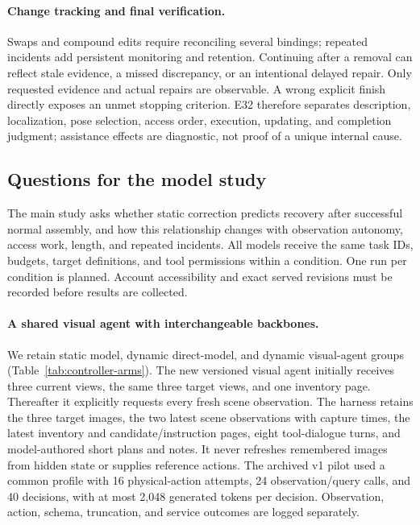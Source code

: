 \documentclass[10pt,twocolumn,letterpaper]{article}
\begin{document}
\paragraph{Change tracking and final verification.}
Swaps and compound edits require reconciling several bindings; repeated incidents add persistent monitoring and retention. Continuing after a removal can reflect stale evidence, a missed discrepancy, or an intentional delayed repair. Only requested evidence and actual repairs are observable. A wrong explicit finish directly exposes an unmet stopping criterion. E32 therefore separates description, localization, pose selection, access order, execution, updating, and completion judgment; assistance effects are diagnostic, not proof of a unique internal cause.



\subsection{Questions for the model study}
The main study asks whether static correction predicts recovery after successful normal assembly, and how this relationship changes with observation autonomy, access work, length, and repeated incidents. All models receive the same task IDs, budgets, target definitions, and tool permissions within a condition. One run per condition is planned. Account accessibility and exact served revisions must be recorded before results are collected.


\paragraph{A shared visual agent with interchangeable backbones.}
We retain static model, dynamic direct-model, and dynamic visual-agent groups (Table~\ref{tab:controller-arms}). The new versioned visual agent initially receives three current views, the same three target views, and one inventory page. Thereafter it explicitly requests every fresh scene observation. The harness retains the three target images, the two latest scene observations with capture times, the latest inventory and candidate/instruction pages, eight tool-dialogue turns, and model-authored short plans and notes. It never refreshes remembered images from hidden state or supplies reference actions. The archived v1 pilot used a common profile with 16 physical-action attempts, 24 observation/query calls, and 40 decisions, with at most 2,048 generated tokens per decision. Observation, action, schema, truncation, and service outcomes are logged separately.
\end{document}
